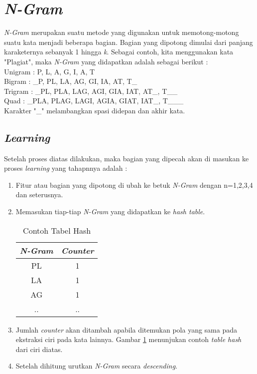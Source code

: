 \documentclass[../Proposal.tex]{subfiles}
\begin{document}
	\section{\textit{N-Gram}}
	\textit{N-Gram} merupakan suatu metode yang digunakan untuk memotong-motong suatu kata menjadi beberapa bagian. Bagian yang dipotong dimulai dari panjang karaketernya sebanyak 1 hingga \textit{k}. Sebagai contoh, kita menggunakan kata "Plagiat", maka \textit{N-Gram} yang didapatkan adalah sebagai berikut : \\
	
	\indent Unigram : P, L, A, G, I, A, T \\
	
	\indent Bigram : \_P, PL, LA, AG, GI, IA, AT, T\_ \\	
	
	\indent Trigram : \_PL, PLA, LAG, AGI, GIA, IAT, AT\_, T\_\_ \\
	
	\indent Quad : \_PLA, PLAG, LAGI, AGIA, GIAT, IAT\_, T\_\_\_ \\
	
	Karakter "\_" melambangkan spasi didepan dan akhir kata.
	
		\subsection{\textit{Learning}}
		Setelah proses diatas dilakukan, maka bagian yang dipecah akan di masukan ke proses \textit{learning} yang tahapnnya adalah :
		\begin{enumerate}
			\item Fitur atau bagian yang dipotong di ubah ke betuk \textit{N-Gram} dengan n=1,2,3,4 dan seterusnya.
			\item Memasukan tiap-tiap \textit{N-Gram} yang didapatkan ke \textit{hash table}.
			
			\begin{table}[h!]
				\centering
				\begin{tabular}{ | c | c | }
					\hline
					\textbf{\textit{N-Gram}} & \textbf{\textit{Counter}} \\ 
					\hline PL & 1 \\  
					\hline LA & 1 \\
					\hline AG & 1 \\  
					\hline .. & ..  
					\\ \hline 
				\end{tabular}
				\caption{Contoh Tabel Hash}
				\label{tabel-hash}
			\end{table}
			
			\item Jumlah \textit{counter} akan ditambah apabila ditemukan pola yang sama pada ekstraksi ciri pada kata lainnya. Gambar \ref{tabel-hash} menunjukan contoh \textit{table hash} dari ciri diatas.
			\item Setelah dihitung urutkan \textit{N-Gram} secara \textit{descending}.
		\end{enumerate}
	
\end{document}
